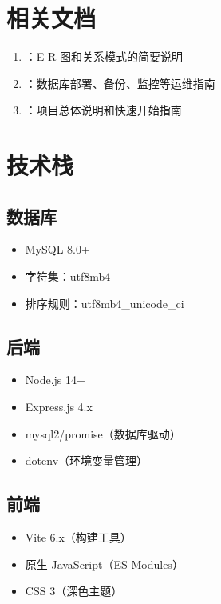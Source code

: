 \section{相关文档}

\begin{enumerate}
  \item {}：E-R 图和关系模式的简要说明
  \item {}：数据库部署、备份、监控等运维指南
  \item {}：项目总体说明和快速开始指南
\end{enumerate}

\section{技术栈}

\subsection{数据库}

\begin{itemize}
  \item MySQL 8.0+
  \item 字符集：utf8mb4
  \item 排序规则：utf8mb4\_unicode\_ci
\end{itemize}

\subsection{后端}

\begin{itemize}
  \item Node.js 14+
  \item Express.js 4.x
  \item mysql2/promise（数据库驱动）
  \item dotenv（环境变量管理）
\end{itemize}

\subsection{前端}

\begin{itemize}
  \item Vite 6.x（构建工具）
  \item 原生 JavaScript（ES Modules）
  \item CSS 3（深色主题）
\end{itemize}

